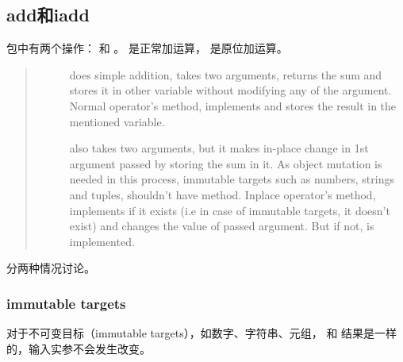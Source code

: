 \documentclass[letterpaper,10pt,english]{sphinxmanual}
\begin{document}
\subsection{add和iadd}
\label{\detokenize{python/01_inplace:addiadd}}
 包中有两个操作： 和  。 是正常加运算，  是原位加运算。
\begin{quote}
\begin{description}
\item[{}] \leavevmode
does simple addition, takes two arguments, returns the sum and stores it in other variable without modifying any of the argument.
Normal operator’s  method, implements  and stores the result in the mentioned variable.

\item[{}] \leavevmode
also takes two arguments, but it makes in-place change in 1st argument passed by storing the sum in it. As object mutation is needed in this process, immutable targets such as numbers, strings and tuples, shouldn’t have  method.
Inplace operator’s  method, implements  if it exists (i.e in case of immutable targets, it doesn’t exist) and changes the value of passed argument. But if not,  is implemented.

\end{description}
\end{quote}

分两种情况讨论。


\subsubsection{immutable targets}
\label{\detokenize{python/01_inplace:immutable-targets}}
对于不可变目标（immutable targets），如数字、字符串、元组，  和  结果是一样的，输入实参不会发生改变。

%
\begin{sphinxVerbatim}[commandchars=\\\{\},numbers=left,firstnumber=1,stepnumber=1]
 

  
  
  
  

   
   
\end{sphinxVerbatim}
\end{document}
